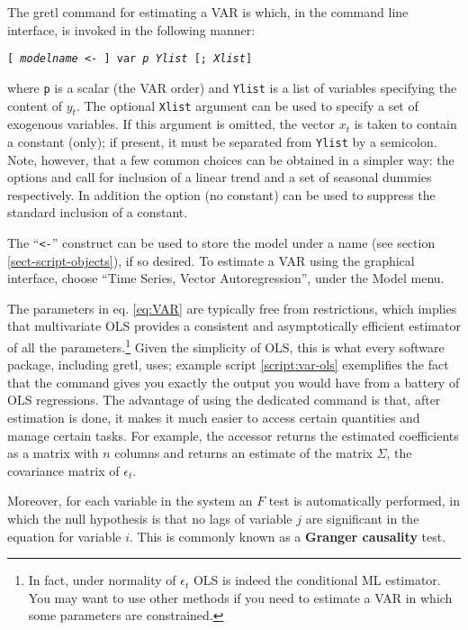 The gretl command for estimating a VAR is  which, in
the command line interface, is invoked in the following manner:
\begin{flushleft}
    \texttt{[ \emph{modelname} \textless - ] var \emph{p} \emph{Ylist} [;
    \emph{Xlist}]}
\end{flushleft}
where \texttt{p} is a scalar (the VAR order) and \texttt{Ylist} is a
list of variables specifying the content of $y_t$.  The optional
\texttt{Xlist} argument can be used to specify a set of exogenous
variables. If this argument is omitted, the vector $x_t$ is taken to
contain a constant (only); if present, it must be separated from
\texttt{Ylist} by a semicolon. Note, however, that a few common
choices can be obtained in a simpler way: the options 
and  call for inclusion of a linear trend and a set
of seasonal dummies respectively. In addition the  option
(no constant) can be used to suppress the standard inclusion of a
constant.

The ``\texttt{\textless -}'' construct can be used to store the model
under a name (see section \ref{sect-script-objects}), if so
desired. To estimate a VAR using the graphical interface, choose
``Time Series, Vector Autoregression'', under the Model menu.

The parameters in eq. \eqref{eq:VAR} are typically free from
restrictions, which implies that multivariate OLS provides a
consistent and asymptotically efficient estimator of all the
parameters.\footnote{In fact, under normality of $\epsilon_t$ OLS is
  indeed the conditional ML estimator. You may want to use other
  methods if you need to estimate a VAR in which some parameters are
  constrained.}  Given the simplicity of OLS, this is what every
software package, including gretl, uses; example script
\ref{script:var-ols} exemplifies the fact that the  command
gives you exactly the output you would have from a battery of OLS
regressions. The advantage of using the dedicated command is that,
after estimation is done, it makes it much easier to access certain
quantities and manage certain tasks. For example, the 
accessor returns the estimated coefficients as a matrix with $n$
columns and  returns an estimate of the matrix $\Sigma$,
the covariance matrix of $\epsilon_t$. 

Moreover, for each variable in the system an $F$ test is automatically
performed, in which the null hypothesis is that no lags of variable
$j$ are significant in the equation for variable $i$. This is commonly
known as a \textbf{Granger causality} test.


